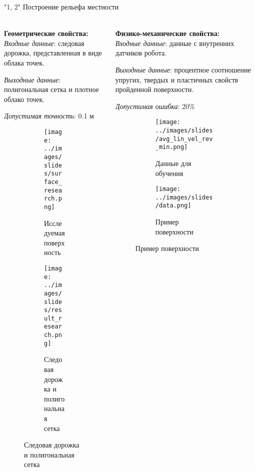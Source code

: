\begin{frame}[t]{"1, 2" Построение рельефа местности}
    \framesubtitle{}
    \begin{columns}[T,onlytextwidth]
        \begin{column}{0.49\textwidth}
            \textbf{Геометрические свойства:}\\
            \textit{Входные данные}: следовая дорожка, представленная в виде облака точек.

            \textit{Выходные данные}: полигональная сетка и плотное облако точек.

            \textit{Допустимая точность}: 0.1 м
            \begin{figure}[H]
                \begin{subfigure}[t]{0.49\textwidth}
                    \centering\texttt{[image: ../images/slides/surface\_research.png]}
                    \caption*{Исследуемая поверхность}
                \end{subfigure}
                \begin{subfigure}[t]{0.49\textwidth}
                    \centering\texttt{[image: ../images/slides/result\_research.png]}
                    \caption*{Следовая дорожка и полигональная сетка}
                \end{subfigure}
            \end{figure}
        \end{column}
        \begin{column}{0.49\textwidth}
            \textbf{Физико-механические свойства:}\\
            \textit{Входные данные}: данные с внутренних датчиков робота.

            \textit{Выходные данные}: процентное соотношение упругих, твердых и пластичных свойств пройденной поверхности.

            \textit{Допустимая ошибка}: 20\% 

            \vspace{-0.35cm}
            \begin{figure}[H]
                \begin{subfigure}[t]{0.49\textwidth}
                    \centering\texttt{[image: ../images/slides/avg\_lin\_vel\_rev\_min.png]}
                    \caption*{Данные для обучения}
                \end{subfigure}
                \begin{subfigure}[t]{0.49\textwidth}
                    \centering\texttt{[image: ../images/slides/data.png]}
                    \caption*{Пример поверхности}
                \end{subfigure}
            \end{figure}
        \end{column}
    \end{columns}
\end{frame}

